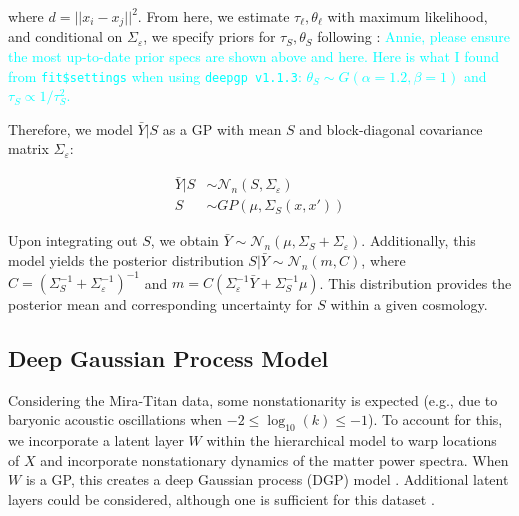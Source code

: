 \documentclass[11pt]{article}
\begin{document}
where $d=||x_i-x_j||^2$. From here, we estimate $\tau_\ell, \theta_\ell$ with maximum likelihood, and conditional on $\Sigma_\varepsilon$, we specify priors for $\tau_S, \theta_S$ following \cite{sauer2023active}: \textcolor{cyan}{Annie, please ensure the most up-to-date prior specs are shown above and here. Here is what I found from \texttt{fit\$settings} when using \texttt{deepgp v1.1.3}: $\theta_S \sim G(\alpha=1.2, \beta=1)$ and $\tau_S \propto 1/\tau_S^2$.}


Therefore, we model $\bar Y|S$ as a GP with mean $S$ and block-diagonal covariance matrix $\Sigma_\varepsilon$:

\begin{align}
\bar Y|S &\sim \mathcal{N}_n(S,\Sigma_\varepsilon) \\
S &\sim GP\left(\mu, \Sigma_S(x,x')\right)
\end{align}

Upon integrating out $S$, we obtain $\bar Y \sim \mathcal{N}_n(\mu, \Sigma_S+\Sigma_\varepsilon)$. Additionally, this model yields the posterior distribution $S|\bar Y \sim \mathcal{N}_n(m, C)$, where $C=\left(\Sigma_S^{-1}+\Sigma_\varepsilon^{-1}\right)^{-1}$ and $m=C\left(\Sigma_\varepsilon^{-1}\bar Y+\Sigma_S^{-1}\mu\right)$. 
This distribution provides the posterior mean and corresponding uncertainty for $S$ within a given cosmology. 

\subsection{Deep Gaussian Process Model}

Considering the Mira-Titan data, some nonstationarity is expected (e.g., due to baryonic acoustic oscillations when $-2 \leq \log_{10}(k) \leq -1$). To account for this, we incorporate a latent layer $W$ within the hierarchical model to warp locations of $X$ and incorporate nonstationary dynamics of the matter power spectra. When $W$ is a GP, this creates a deep Gaussian process (DGP) model \citep{damianou2013deep}. Additional latent layers could be considered, although one is sufficient for this dataset \citep{dunlop2018deep}.
\end{document}
